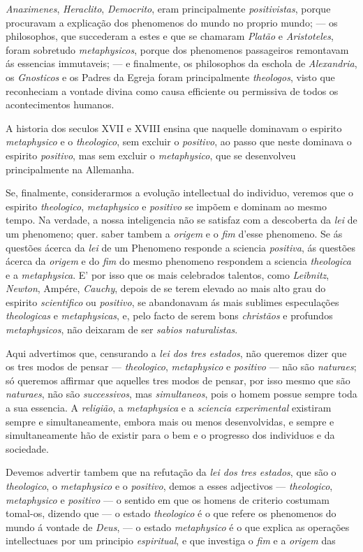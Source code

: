 \emph{Anaximenes}, \emph{Heraclito}, \emph{Democrito}, eram principalmente \emph{positivistas}, porque procuravam a explicação dos phenomenos do mundo no proprio mundo; --- os philosophos, que succederam a estes e que se chamaram \emph{Platão} e \emph{Aristoteles}, foram sobretudo \emph{metaphysicos}, porque dos phenomenos passageiros remontavam ás essencias immutaveis; --- e finalmente, os philosophos da eschola de \emph{Alexandria}, os \emph{Gnosticos} e os Padres da Egreja foram principalmente \emph{theologos}, visto que reconheciam a vontade divina como causa efficiente ou permissiva de todos os acontecimentos humanos.\par A historia dos seculos XVII e XVIII ensina que naquelle dominavam o espirito \emph{metaphysico} e o \emph{theologico}, sem excluir o \emph{positivo}, ao passo que neste dominava o espirito \emph{positivo}, mas sem excluir o \emph{metaphysico}, que se desenvolveu principalmente na Allemanha.\par Se, finalmente, considerarmos a evolução intellectual do individuo, veremos que o espirito \emph{theologico}, \emph{metaphysico} e \emph{positivo} se impõem e dominam ao mesmo tempo. Na verdade, a nossa inteligencia não se satisfaz com a descoberta da \emph{lei} de um phenomeno; quer. saber tambem a \emph{origem} e o \emph{fim} d'esse phenomeno. Se ás questões ácerca da \emph{lei} de um Phenomeno responde a sciencia \emph{positiva}, ás questões ácerca da \emph{origem} e do \emph{fim} do mesmo phenomeno respondem a sciencia \emph{theologica} e a \emph{metaphysica}. E' por isso que os mais celebrados talentos, como \emph{Leibnitz}, \emph{Newton}, Ampére, \emph{Cauchy}, depois de se terem elevado ao mais alto grau do espirito \emph{scientifico} ou \emph{positivo}, se abandonavam ás mais sublimes especulações \emph{theologicas} e \emph{metaphysicas}, e, pelo facto de serem bons \emph{christãos} e profundos \emph{metaphysicos}, não deixaram de ser \emph{sabios naturalistas}.\par Aqui advertimos que, censurando a \emph{lei dos tres estados}, não queremos dizer que os tres modos de pensar --- \emph{theologico}, \emph{metaphysico} e \emph{positivo} --- não são \emph{naturaes}; só queremos affirmar que aquelles tres modos de pensar, por isso mesmo que são \emph{naturaes}, não são \emph{successivos}, mas \emph{simultaneos}, pois o homem possue sempre toda a sua essencia. A \emph{religião}, a \emph{metaphysica} e a \emph{sciencia experimental} existiram sempre e simultaneamente, embora mais ou menos desenvolvidas, e sempre e simultaneamente hão de existir para o bem e o progresso dos individuos e da sociedade.\par Devemos advertir tambem que na refutação da \emph{lei dos tres estados}, que são o \emph{theologico}, o \emph{metaphysico} e o \emph{positivo}, demos a esses adjectivos --- \emph{theologico}, \emph{metaphysico} e \emph{positivo} --- o sentido em que os homens de criterio costumam tomal-os, dizendo que --- o estado \emph{theologico} é o que refere os phenomenos do mundo á vontade de \emph{Deus}, --- o estado \emph{metaphysico} é o que explica as operações intellectuaes por um principio \emph{espiritual}, e que investiga o \emph{fim} e a \emph{origem} das 